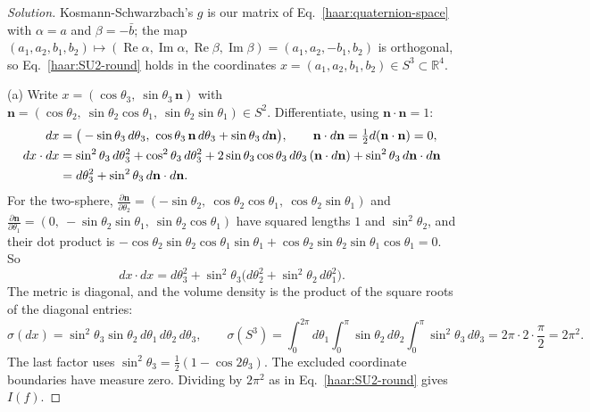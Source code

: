 \begin{proof}[Solution]
Kosmann-Schwarzbach's $g$ is our matrix of Eq.~\eqref{haar:quaternion-space}
with $\alpha=a$ and $\beta=-\bar b$; the map $(a_1,a_2,b_1,b_2)\mapsto
(\operatorname{Re}\alpha,\operatorname{Im}\alpha,\operatorname{Re}\beta,
\operatorname{Im}\beta)=(a_1,a_2,-b_1,b_2)$ is orthogonal, so
Eq.~\eqref{haar:SU2-round} holds in the coordinates
$x=(a_1,a_2,b_1,b_2)\in S^3\subset\mathbb R^4$.

(a) Write $x=(\cos\theta_3,\ \sin\theta_3\,\mathbf n)$ with
$\mathbf n=(\cos\theta_2,\ \sin\theta_2\cos\theta_1,\ \sin\theta_2\sin\theta_1)\in S^2$.
Differentiate, using $\mathbf n\cdot\mathbf n=1$:
\begin{align}
 dx&=\big(-\sin\theta_3\,d\theta_3,\ \cos\theta_3\,\mathbf n\,d\theta_3
     +\sin\theta_3\,d\mathbf n\big),\qquad
 \mathbf n\cdot d\mathbf n=\tfrac12d(\mathbf n\cdot\mathbf n)=0,\notag\\
 dx\cdot dx&=\sin^2\theta_3\,d\theta_3^2+\cos^2\theta_3\,d\theta_3^2
     +2\sin\theta_3\cos\theta_3\,d\theta_3\,(\mathbf n\cdot d\mathbf n)
     +\sin^2\theta_3\,d\mathbf n\cdot d\mathbf n\notag\\
 &=d\theta_3^2+\sin^2\theta_3\,d\mathbf n\cdot d\mathbf n .
 \label{haar:S3-metric-1}
\end{align}
For the two-sphere,
$\frac{\partial\mathbf n}{\partial\theta_2}=(-\sin\theta_2,\
\cos\theta_2\cos\theta_1,\ \cos\theta_2\sin\theta_1)$ and
$\frac{\partial\mathbf n}{\partial\theta_1}=(0,\ -\sin\theta_2\sin\theta_1,\
\sin\theta_2\cos\theta_1)$ have squared lengths $1$ and $\sin^2\theta_2$, and
their dot product is
$-\cos\theta_2\sin\theta_2\cos\theta_1\sin\theta_1
+\cos\theta_2\sin\theta_2\sin\theta_1\cos\theta_1=0$. So
\begin{equation}\label{haar:S3-metric}
 dx\cdot dx=d\theta_3^2+\sin^2\theta_3\big(d\theta_2^2
 +\sin^2\theta_2\,d\theta_1^2\big).
\end{equation}
The metric is diagonal, and the volume density is the product of the square
roots of the diagonal entries:
\begin{equation}\label{haar:S3-volume}
 \sigma(dx)=\sin^2\theta_3\sin\theta_2\,d\theta_1\,d\theta_2\,d\theta_3,
 \qquad
 \sigma(S^3)=\int_0^{2\pi}d\theta_1\int_0^\pi\sin\theta_2\,d\theta_2
 \int_0^\pi\sin^2\theta_3\,d\theta_3=2\pi\cdot2\cdot\frac\pi2=2\pi^2 .
\end{equation}
The last factor uses $\sin^2\theta_3=\frac12(1-\cos2\theta_3)$. The excluded
coordinate boundaries have measure zero. Dividing by $2\pi^2$ as in
Eq.~\eqref{haar:SU2-round} gives $I(f)$.


\end{proof}
